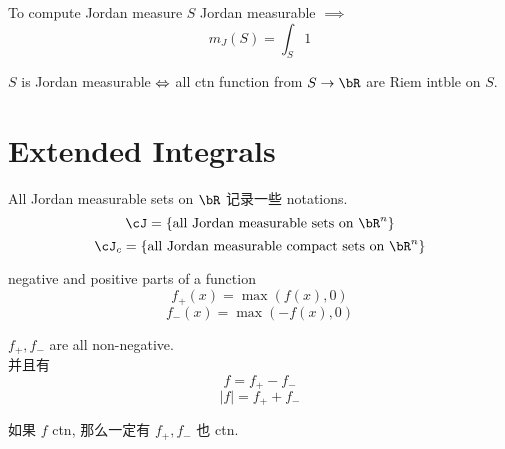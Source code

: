 \documentclass[lang=cn,11pt]{elegantbook}
\begin{document}
\begin{corollary}{To compute Jordan measure}
    $S$ Jordan measurable $\implies$ 
    $$
    m_J (S) = \int_S 1 
    $$
\end{corollary}



\begin{corollary}
    $S$ is Jordan measurable $\Leftrightarrow$ all ctn function from $S \rar \bR$ are Riem intble on $S$.
\end{corollary}




\section{Extended Integrals}
\begin{definition}{All Jordan measurable sets on $\bR$}
    记录一些 notations.\\
    $$
    \cJ = \{ \text{all Jordan measurable sets on } \bR^n \}
    $$
    $$
    \cJ_c = \{ \text{all Jordan measurable compact sets on } \bR^n \}
    $$
\end{definition}


\begin{definition}{negative and positive parts of a function}
    $$
    f_+ (x) = \max(f(x), 0)
    $$
    $$
    f_- (x) = \max(-f(x), 0)
    $$
\end{definition}

\begin{note}
    $f_+, f_-$ are all non-negative.\\
    并且有
    $$
    f = f_+ - f_-
    $$
    $$
    |f| = f_+ + f_-
    $$
\end{note}


\begin{remark}
    如果 $f$ ctn, 那么一定有 $f_+, f_-$ 也 ctn.
\end{remark}
\end{document}
